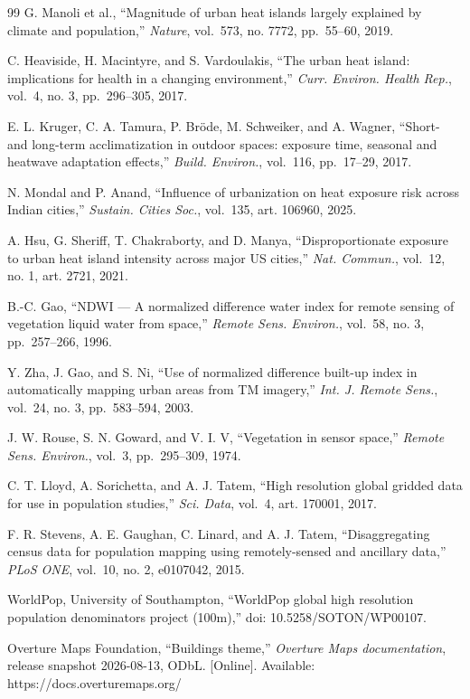 \begin{thebibliography}{99}
 G. Manoli et al., ``Magnitude of urban heat islands largely explained by climate and population,''
\emph{Nature}, vol.~573, no. 7772, pp.~55--60, 2019.


 C. Heaviside, H. Macintyre, and S. Vardoulakis, ``The urban heat island: implications for health in
a changing environment,'' \emph{Curr. Environ. Health Rep.}, vol.~4, no. 3, pp.~296--305, 2017.


 E. L. Kruger, C. A. Tamura, P. Bröde, M. Schweiker, and A. Wagner, ``Short- and long-term
acclimatization in outdoor spaces: exposure time, seasonal and heatwave adaptation effects,'' \emph{Build.
Environ.}, vol.~116, pp.~17--29, 2017.


 N. Mondal and P. Anand, ``Influence of urbanization on heat exposure risk across Indian cities,''
\emph{Sustain. Cities Soc.}, vol.~135, art. 106960, 2025.


 A. Hsu, G. Sheriff, T. Chakraborty, and D. Manya, ``Disproportionate exposure to urban heat island
intensity across major US cities,'' \emph{Nat. Commun.}, vol.~12, no. 1, art. 2721, 2021.


 B.-C. Gao, ``NDWI --- A normalized difference water index for remote sensing of vegetation liquid
water from space,'' \emph{Remote Sens. Environ.}, vol.~58, no. 3, pp.~257--266, 1996.


 Y. Zha, J. Gao, and S. Ni, ``Use of normalized difference built-up index in automatically mapping
urban areas from TM imagery,'' \emph{Int. J. Remote Sens.}, vol.~24, no. 3, pp.~583--594, 2003.


 J. W. Rouse, S. N. Goward, and V. I. V, ``Vegetation in sensor space,'' \emph{Remote Sens. Environ.},
vol.~3, pp.~295--309, 1974.


 C. T. Lloyd, A. Sorichetta, and A. J. Tatem, ``High resolution global gridded data for use in
population studies,'' \emph{Sci. Data}, vol.~4, art. 170001, 2017.


 F. R. Stevens, A. E. Gaughan, C. Linard, and A. J. Tatem, ``Disaggregating census data for
population mapping using remotely-sensed and ancillary data,'' \emph{PLoS ONE}, vol.~10, no. 2, e0107042,
2015.


 WorldPop, University of Southampton, ``WorldPop global high resolution population denominators
project (100m),'' doi: 10.5258/SOTON/WP00107.


 Overture Maps Foundation, ``Buildings theme,'' \emph{Overture Maps documentation}, release snapshot
2026-08-13, ODbL. {[}Online{]}. Available: https://docs.overturemaps.org/



\end{thebibliography}
